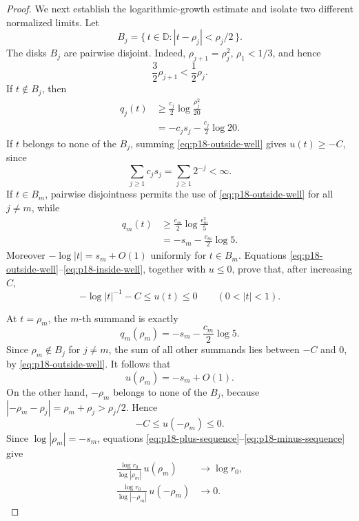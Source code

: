 \begin{proof}
We next establish the logarithmic-growth estimate and isolate two
different normalized limits.  Let
\[
                B_j=\{\,t\in\mathbb D:
                         |t-\rho_j|<\rho_j/2\,\}.
\]
The disks \(B_j\) are pairwise disjoint.  Indeed,
\(\rho_{j+1}=\rho_j^2\), \(\rho_1<1/3\), and hence
\[
                    \frac32\rho_{j+1}
                    <\frac12\rho_j .
\]
If \(t\notin B_j\), then
\[
\begin{aligned}
 q_j(t)
 &\geq\frac{c_j}{2}
       \log\frac{\rho_j^2}{20}\\
 &=-c_js_j-\frac{c_j}{2}\log20.
\end{aligned}
\tag{66.20h}\label{eq:p18-outside-well}
\]
If \(t\) belongs to none of the \(B_j\), summing
\eqref{eq:p18-outside-well} gives \(u(t)\geq-C\), since
\[
                \sum_{j\geq1}c_js_j=\sum_{j\geq1}2^{-j}<\infty.
\]
If \(t\in B_m\), pairwise disjointness permits the use of
\eqref{eq:p18-outside-well} for all \(j\ne m\), while
\[
\begin{aligned}
 q_m(t)
 &\geq\frac{c_m}{2}\log\frac{\epsilon_m^2}{5}\\
 &=-s_m-\frac{c_m}{2}\log5.
\end{aligned}
\tag{66.20i}\label{eq:p18-inside-well}
\]
Moreover \(-\log|t|=s_m+O(1)\) uniformly for \(t\in B_m\).
Equations \eqref{eq:p18-outside-well}--\eqref{eq:p18-inside-well},
together with \(u\leq0\), prove that, after increasing \(C\),
\[
             -\log|t|^{-1}-C\leq u(t)\leq0
             \qquad(0<|t|<1).
\tag{66.20j}\label{eq:p18-log-growth}
\]

At \(t=\rho_m\), the \(m\)-th summand is exactly
\[
                  q_m(\rho_m)
                  =-s_m-\frac{c_m}{2}\log5.
\]
Since \(\rho_m\notin B_j\) for \(j\ne m\), the sum of all other
summands lies between \(-C\) and \(0\), by
\eqref{eq:p18-outside-well}.  It follows that
\[
                         u(\rho_m)=-s_m+O(1).
\tag{66.20k}\label{eq:p18-plus-sequence}
\]
On the other hand, \(-\rho_m\) belongs to none of the \(B_j\), because
\(|-\rho_m-\rho_j|=\rho_m+\rho_j>\rho_j/2\).  Hence
\[
                         -C\leq u(-\rho_m)\leq0.
\tag{66.20l}\label{eq:p18-minus-sequence}
\]
Since \(\log|\rho_m|=-s_m\), equations
\eqref{eq:p18-plus-sequence}--\eqref{eq:p18-minus-sequence} give
\[
\begin{aligned}
 \frac{\log r_0}{\log|\rho_m|}\,u(\rho_m)
   &\longrightarrow\log r_0,\\
 \frac{\log r_0}{\log|-\rho_m|}\,u(-\rho_m)
   &\longrightarrow0.
\end{aligned}
\tag{66.20m}\label{eq:p18-two-limits}
\]


\end{proof}
